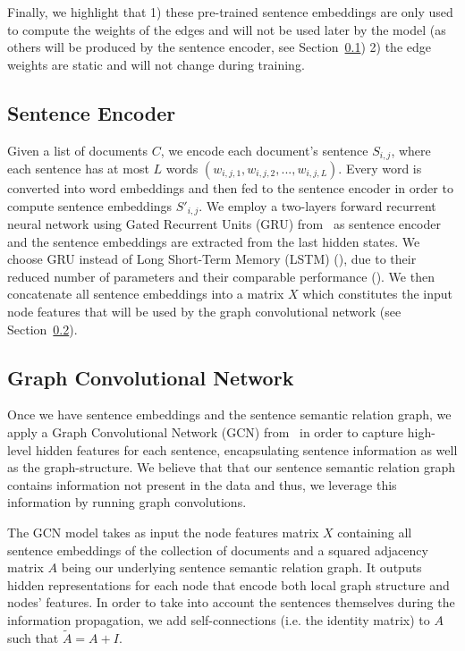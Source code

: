 \documentclass{article}
\begin{document}
Finally, we highlight that 1) these pre-trained sentence embeddings are only used to compute the weights of the edges and will not be used later by the model (as others will be produced by the sentence encoder, see Section~\ref{sub:sentence_encoder}) 2) the edge weights are static and will not change during training.

\subsection{Sentence Encoder}
\label{sub:sentence_encoder}

Given a list of documents $C$, we encode each document's sentence $S_{i,j}$, where each sentence has at most $L$ words $(w_{i,j,1}, w_{i,j,2}, ..., w_{i,j,L})$. Every word is converted into word embeddings and then fed to the sentence encoder in order to compute sentence embeddings $S'_{i,j}$.
We employ a two-layers forward recurrent neural network using Gated Recurrent Units (GRU) from~\citet{cho-gru} as sentence encoder and the sentence embeddings are extracted from the last hidden states. We choose GRU instead of Long Short-Term Memory (LSTM) (\citet{Hochreiter1997}), due to their reduced number of parameters and their comparable performance (\citet{cho-al-emnlp142}). We then concatenate all sentence embeddings into a matrix $X$ which constitutes the input node features that will be used by the graph convolutional network (see Section~\ref{sub:gcn}).

\subsection{Graph Convolutional Network}
\label{sub:gcn}

Once we have sentence embeddings and the sentence semantic relation graph, we apply a Graph Convolutional Network (GCN) from~\citet{KipfW16} in order to capture high-level hidden features for each sentence, encapsulating sentence information as well as the graph-structure. We believe that that our sentence semantic relation graph contains information not present in the data and thus, we leverage this information by running graph convolutions.

The GCN model takes as input the node features matrix $X$ containing all sentence embeddings of the collection of documents and a squared adjacency matrix $A$ being our underlying sentence semantic relation graph. It outputs hidden representations for each node that encode both local graph structure and nodes' features.
 In order to take into account the sentences themselves during the information propagation, we add self-connections (i.e. the identity matrix) to $A$ such that $\tilde{A} = A + I$.
 
\end{document}
